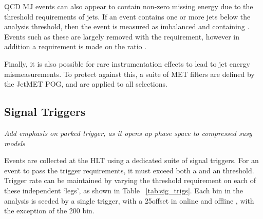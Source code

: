 QCD MJ events can also appear to contain non-zero missing energy 
due to the threshold requirements of jets. If an event contains 
one or more jets below the analysis threshold, then the 
event is measured as imbalanced and containing \mht. Events such as these are largely 
removed with the \alphat requirement, however in addition a requirement is made on the
ratio \mhtmet.

Finally, it is also possible for rare instrumentation effects to lead to jet 
energy
mismeasurements. To protect against this, a suite of MET filters are defined by 
the JetMET POG, and are applied to all selections.


\subsection{Signal Triggers}

\emph{Add emphasis on parked trigger, as it opens up phase space to compressed susy models}

Events are collected at the HLT using a dedicated suite of
signal triggers. For an event to pass the trigger
requirements, it must exceed both a \HT and an \alphat threshold. Trigger rate 
can be maintained by varying the
threshold requirement on each of these independent `legs', as shown in Table~
\ref{tab:sig_trigs}. Each \HT bin in the analysis is seeded by a single trigger,
with a 25\gev offset in online and offline \HT, with the exception of the 200
\gev bin.


